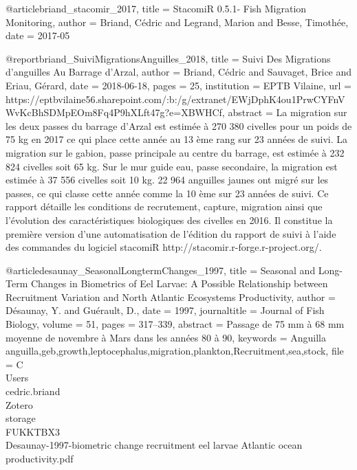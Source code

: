 @article{briand_stacomir_2017,
  title = {{{StacomiR}} 0.5.1- Fish Migration Monitoring},
  author = {Briand, Cédric and Legrand, Marion and Besse, Timothée},
  date = {2017-05}
}

@report{briand_SuiviMigrationsAnguilles_2018,
  title = {Suivi Des Migrations d'anguilles Au Barrage d'{{Arzal}}},
  author = {Briand, Cédric and Sauvaget, Brice and Eriau, Gérard},
  date = {2018-06-18},
  pages = {25},
  institution = {{EPTB Vilaine}},
  url = {https://eptbvilaine56.sharepoint.com/:b:/g/extranet/EWjDphK4ou1PrwCYFnVWvKcBhSDMpEOm8Fq4P9hXLft47g?e=XBWHCf},
  abstract = {La migration sur les deux passes du barrage d'Arzal est estimée à 270 380 civelles pour un poids de 75 kg en 2017 ce qui place cette année au 13 ème rang sur 23 années de suivi. La migration sur le gabion, passe principale au centre du barrage, est estimée à 232 824 civelles soit 65 kg. Sur le mur guide eau, passe secondaire, la migration est estimée à 37 556 civelles soit 10 kg. 22 964 anguilles jaunes ont migré sur les passes, ce qui classe cette année comme la 10 ème sur 23 années de suivi. Ce rapport détaille les conditions de recrutement, capture, migration ainsi que l'évolution des caractéristiques biologiques des civelles en 2016. Il constitue la première version d'une automatisation de l'édition du rapport de suivi à l'aide des commandes du logiciel stacomiR http://stacomir.r-forge.r-project.org/.}
}

@article{desaunay_SeasonalLongtermChanges_1997,
  title = {Seasonal and Long-Term Changes in Biometrics of Eel Larvae: A Possible Relationship between Recruitment Variation and {{North Atlantic}} Ecosystems Productivity},
  author = {Désaunay, Y. and Guérault, D.},
  date = {1997},
  journaltitle = {Journal of Fish Biology},
  volume = {51},
  pages = {317--339},
  abstract = {Passage de 75 mm à 68 mm moyenne de novembre à Mars dans les années 80 à 90},
  keywords = {Anguilla anguilla,geb,growth,leptocephalus,migration,plankton,Recruitment,sea,stock},
  file = {C\:\\Users\\cedric.briand\\Zotero\\storage\\FUKKTBX3\\Desaunay-1997-biometric change recruitment eel larvae Atlantic ocean productivity.pdf}
}

